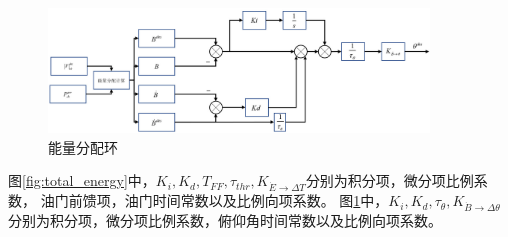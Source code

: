 \begin{figure}[H]
    \centering
    \includegraphics[width=0.9\textwidth]{figures/c3/TECS_pitch.jpg}
    \caption{能量分配环}\label{fig:balance_energy}
\end{figure}
图\ref{fig:total_energy}中，$K_i,K_d,T_{FF},\tau_{thr},K_{\dot{E}\rightarrow\Delta T}$分别为积分项，微分项比例系数，
油门前馈项，油门时间常数以及比例向项系数。
图\ref{fig:balance_energy}中，$K_i,K_d,\tau_{\theta},K_{\dot{B}\rightarrow\Delta \theta}$分别为积分项，微分项比例系数，俯仰角时间常数以及比例向项系数。
